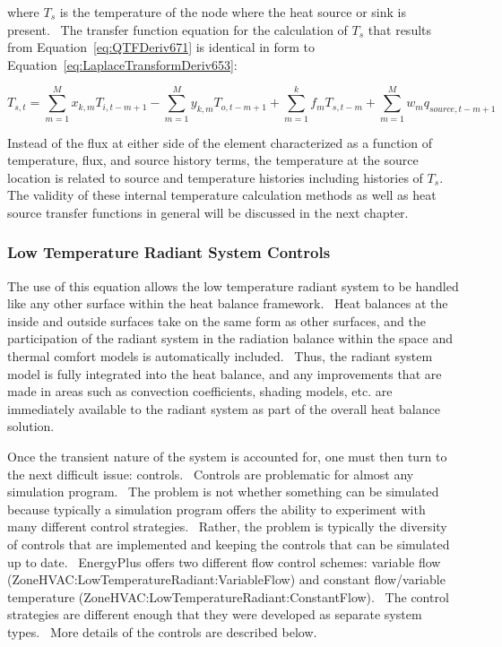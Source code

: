 where \(T_s\) is the temperature of the node where the heat source or sink is present.~ The transfer function equation for the calculation of \(T_s\) that results from Equation~\ref{eq:QTFDeriv671} is identical in form to Equation~\ref{eq:LaplaceTransformDeriv653}:

\begin{equation}
{T_{s,t}} = \sum\limits_{m = 1}^M {{x_{k,m}}{T_{i,t - m + 1}}}  - \sum\limits_{m = 1}^M {{y_{k,m}}{T_{o,t - m + 1}}}  + \sum\limits_{m = 1}^k {{f_m}{T_{s,t - m}}}  + \sum\limits_{m = 1}^M {{w_m}{q_{source,t - m + 1}}}
\label{eq:QTFDeriv672}
\end{equation}

Instead of the flux at either side of the element characterized as a function of temperature, flux, and source history terms, the temperature at the source location is related to source and temperature histories including histories of \(T_s\).~ The validity of these internal temperature calculation methods as well as heat source transfer functions in general will be discussed in the next chapter.

\subsubsection{Low Temperature Radiant System Controls}\label{low-temperature-radiant-system-controls}

The use of this equation allows the low temperature radiant system to be handled like any other surface within the heat balance framework.~ Heat balances at the inside and outside surfaces take on the same form as other surfaces, and the participation of the radiant system in the radiation balance within the space and thermal comfort models is automatically included.~ Thus, the radiant system model is fully integrated into the heat balance, and any improvements that are made in areas such as convection coefficients, shading models, etc. are immediately available to the radiant system as part of the overall heat balance solution.

Once the transient nature of the system is accounted for, one must then turn to the next difficult issue: controls.~ Controls are problematic for almost any simulation program.~ The problem is not whether something can be simulated because typically a simulation program offers the ability to experiment with many different control strategies.~ Rather, the problem is typically the diversity of controls that are implemented and keeping the controls that can be simulated up to date.~ EnergyPlus offers two different flow control schemes: variable flow (ZoneHVAC:LowTemperatureRadiant:VariableFlow) and constant flow/variable temperature (ZoneHVAC:LowTemperatureRadiant:ConstantFlow).~ The control strategies are different enough that they were developed as separate system types.~ More details of the controls are described below.

